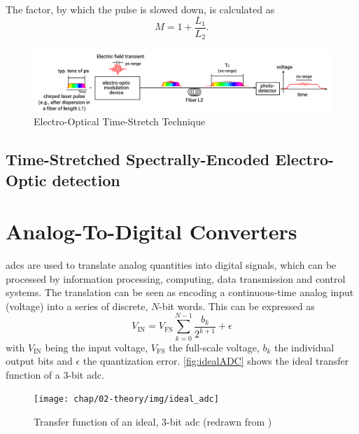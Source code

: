 The factor, by which the pulse is slowed down, is calculated as
\begin{equation}
	M = 1 + \frac{L_1}{L_2}.
\end{equation}

\begin{figure}[tbh]
	\centering
	\includegraphics[width = \textwidth]{chap/02-theory/img/time_stretch.png}
	\caption{Electro-Optical Time-Stretch Technique \cite{szwaj}}
	\label{fig:eo_ts}
\end{figure}

\subsection{Time-Stretched Spectrally-Encoded Electro-Optic detection}





\newpage
\section{Analog-To-Digital Converters}
\Glspl{adc} are used to translate analog quantities into digital signals, which can be processed by information processing, computing, data transmission and control systems. The translation can be seen as encoding a continuous-time analog input (voltage) into a series of discrete, $N$-bit words. This can be expressed as
\begin{equation}
	V_{\text{IN}} = V_{\text{FS}} \sum_{k = 0}^{N-1} \frac{b_k}{2^{k+1}} + \epsilon
\end{equation}
with $V_{\text{IN}}$ being the input voltage, $V_{\text{FS}}$ the full-scale voltage, $b_k$ the individual output bits and $\epsilon$ the quantization error. \autoref{fig:idealADC} shows the ideal transfer function of a 3-bit \gls{adc}.
\begin{figure}[H]
	\centering
	\texttt{[image: chap/02-theory/img/ideal\_adc]}
	\caption{Transfer function of an ideal, 3-bit \gls{adc} (redrawn from \cite{Lundberg})}
	\label{fig:idealADC}
\end{figure}

